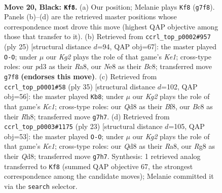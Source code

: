 \documentclass[11pt]{article}
\begin{document}
\clearpage

\begin{figure}[p]\centering
\begin{subfigure}{0.46\textwidth}\centering
\resizebox{\linewidth}{!}{%
\newchessgame
\chessboard[
  setfen={2bqn1r1/r3bpk1/p2p2p1/n1p1p2p/Pp2P3/3PQ2N/BPPB1PPP/RN2R1K1 b - - 1 20},
  showmover=false,
  pgfstyle=straightmove, color=movearrow, markmove={g7-f8}
]}
\caption{}
\end{subfigure}\hfill
\begin{subfigure}{0.46\textwidth}\centering
\resizebox{\linewidth}{!}{%
\newchessgame
\chessboard[
  setfen={r1b1k2r/2q1bppp/p1nppn2/2p5/Pp2PB2/1B1P4/1PPNNPPP/R2QR1K1 b kq - 3 13},
  showmover=false,
  pgfstyle=straightmove, color=movearrow, markmove={e8-g8}
]}
\caption{}
\end{subfigure}
\\[4pt]
\begin{subfigure}{0.46\textwidth}\centering
\resizebox{\linewidth}{!}{%
\newchessgame
\chessboard[
  setfen={2kr1b1r/1ppbnp1q/p3p1p1/3pP2n/3P4/2NBBP1N/PPPQ3P/1K1R3R b - - 0 18},
  showmover=false,
  pgfstyle=straightmove, color=movearrow, markmove={c8-b8}
]}
\caption{}
\end{subfigure}\hfill
\begin{subfigure}{0.46\textwidth}\centering
\resizebox{\linewidth}{!}{%
\newchessgame
\chessboard[
  setfen={r2qk2r/1p2bppp/pn1pb3/4p1Pn/4P3/1NN1BP2/PPPQ3P/2KR1B1R b kq - 4 12},
  showmover=false,
  pgfstyle=straightmove, color=movearrow, markmove={e8-g8}
]}
\caption{}
\end{subfigure}
\caption{\textbf{Move 20, Black: \texttt{Kf8}.} (a) Our position; Melanie plays \texttt{Kf8} (\texttt{g7f8}). Panels (b)--(d) are the retrieved master positions whose correspondence most drove this move (highest QAP objective among those that transfer to it). (b) Retrieved from \texttt{ccrl\_top\_p0002\#957} (ply 25) [structural distance $d$=94, QAP obj=67]: the master played \texttt{O-O}; under $\mu$ our \emph{Kg2} plays the role of that game's \emph{Ke1}; cross-type roles: our \emph{p}d3 as their \emph{R}a8, our \emph{N}e8 as their \emph{B}c8; transferred move \texttt{g7f8} \textbf{(endorses this move)}. (c) Retrieved from \texttt{ccrl\_top\_p0001\#58} (ply 35) [structural distance $d$=102, QAP obj=56]: the master played \texttt{Kb8}; under $\mu$ our \emph{Kg2} plays the role of that game's \emph{Kc1}; cross-type roles: our \emph{Q}d8 as their \emph{B}f8, our \emph{B}c8 as their \emph{R}h8; transferred move \texttt{g7h7}. (d) Retrieved from \texttt{ccrl\_top\_p0003\#1175} (ply 23) [structural distance $d$=105, QAP obj=53]: the master played \texttt{O-O}; under $\mu$ our \emph{Kg2} plays the role of that game's \emph{Ke1}; cross-type roles: our \emph{Q}d8 as their \emph{R}a8, our \emph{R}g8 as their \emph{Q}d8; transferred move \texttt{g7h7}. Synthesis: 1 retrieved analog transferred to \texttt{Kf8} (summed QAP objective 67, the strongest correspondence among the candidate moves); Melanie committed it via the \texttt{search} selector.}
\label{fig:thought-m39}
\end{figure}
\end{document}
